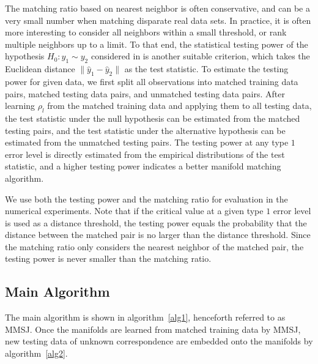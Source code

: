 \documentclass[times,twocolumn,final]{elsarticle}
\begin{document}
The matching ratio based on nearest neighbor is often conservative, and can be a very small number when matching disparate real data sets. In practice, it is often more interesting to consider all neighbors within a small threshold, or rank multiple neighbors up to a limit. To that end, the statistical testing power of the hypothesis $H_{0}: y_{1} \sim y_{2}$ considered in \citep{PriebeMarchette2012} is another suitable criterion, which takes the Euclidean distance $\|\hat{y}_{1}- \hat{y}_{2}\|$ as the test statistic. To estimate the testing power for given data, we first split all observations into matched training data pairs, matched testing data pairs, and unmatched testing data pairs. After learning $\rho_{l}$ from the matched training data and applying them to all testing data, the test statistic under the null hypothesis can be estimated from the matched testing pairs, and the test statistic under the alternative hypothesis can be estimated from the unmatched testing pairs. The testing power at any type $1$ error level is directly estimated from the empirical distributions of the test statistic, and a higher testing power indicates a better manifold matching algorithm. 

We use both the testing power and the matching ratio for evaluation in the numerical experiments. Note that if the critical value at a given type $1$ error level is used as a distance threshold, the testing power equals the probability that the distance between the matched pair is no larger than the distance threshold. Since the matching ratio only considers the nearest neighbor of the matched pair, the testing power is never smaller than the matching ratio.
%
%
%
%
%

\subsection{Main Algorithm}
\label{main1}
The main algorithm is shown in algorithm~\ref{alg1}, henceforth referred to as MMSJ. Once the manifolds are learned from matched training data by MMSJ, new testing data of unknown correspondence are embedded onto the manifolds by algorithm~\ref{alg2}.
\end{document}
